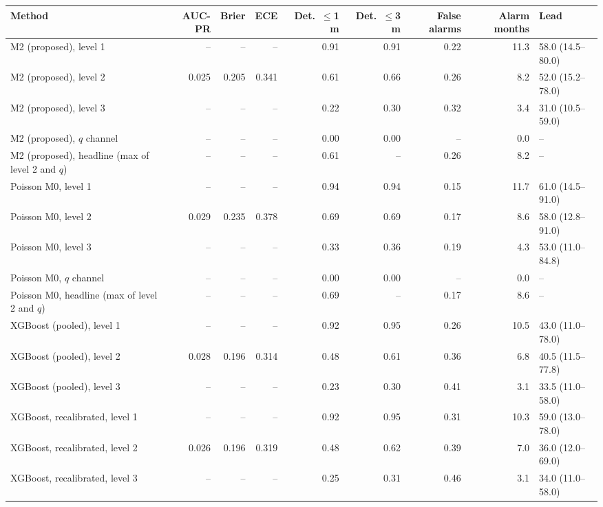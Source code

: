 \documentclass[10pt,a4paper]{article}
\begin{document}
\vspace{6pt}
\noindent\begin{minipage}{\linewidth}
\centering\tiny
\begin{tabular}{lrrrrrrrl}
\toprule
Method & AUC-PR & Brier & ECE & Det.\ $\leq$1 m & Det.\ $\leq$3 m & False alarms & Alarm months & Lead \\ \midrule
M2 (proposed), level 1 & -- & -- & -- & 0.91 & 0.91 & 0.22 & 11.3 & 58.0 (14.5--80.0) \\
M2 (proposed), level 2 & 0.025 & 0.205 & 0.341 & 0.61 & 0.66 & 0.26 & 8.2 & 52.0 (15.2--78.0) \\
M2 (proposed), level 3 & -- & -- & -- & 0.22 & 0.30 & 0.32 & 3.4 & 31.0 (10.5--59.0) \\
M2 (proposed), $q$ channel & -- & -- & -- & 0.00 & 0.00 & -- & 0.0 & -- \\
M2 (proposed), headline (max of level 2 and $q$) & -- & -- & -- & 0.61 & -- & 0.26 & 8.2 & -- \\
Poisson M0, level 1 & -- & -- & -- & 0.94 & 0.94 & 0.15 & 11.7 & 61.0 (14.5--91.0) \\
Poisson M0, level 2 & 0.029 & 0.235 & 0.378 & 0.69 & 0.69 & 0.17 & 8.6 & 58.0 (12.8--91.0) \\
Poisson M0, level 3 & -- & -- & -- & 0.33 & 0.36 & 0.19 & 4.3 & 53.0 (11.0--84.8) \\
Poisson M0, $q$ channel & -- & -- & -- & 0.00 & 0.00 & -- & 0.0 & -- \\
Poisson M0, headline (max of level 2 and $q$) & -- & -- & -- & 0.69 & -- & 0.17 & 8.6 & -- \\
XGBoost (pooled), level 1 & -- & -- & -- & 0.92 & 0.95 & 0.26 & 10.5 & 43.0 (11.0--78.0) \\
XGBoost (pooled), level 2 & 0.028 & 0.196 & 0.314 & 0.48 & 0.61 & 0.36 & 6.8 & 40.5 (11.5--77.8) \\
XGBoost (pooled), level 3 & -- & -- & -- & 0.23 & 0.30 & 0.41 & 3.1 & 33.5 (11.0--58.0) \\
XGBoost, recalibrated, level 1 & -- & -- & -- & 0.92 & 0.95 & 0.31 & 10.3 & 59.0 (13.0--78.0) \\
XGBoost, recalibrated, level 2 & 0.026 & 0.196 & 0.319 & 0.48 & 0.62 & 0.39 & 7.0 & 36.0 (12.0--69.0) \\
XGBoost, recalibrated, level 3 & -- & -- & -- & 0.25 & 0.31 & 0.46 & 3.1 & 34.0 (11.0--58.0) \\

\end{tabular}
\end{minipage}
\end{document}
